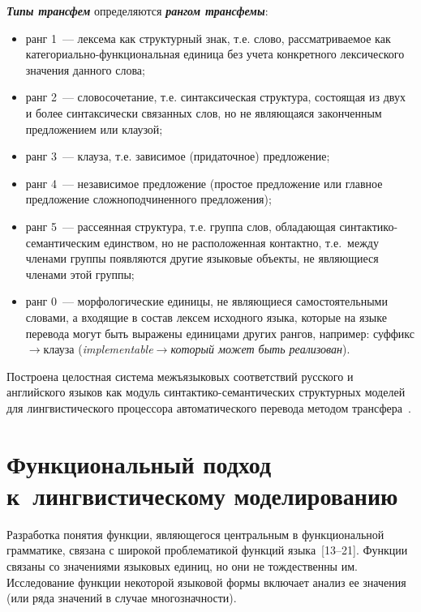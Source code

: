 \begin{multicols}{2}
{\bfseries\textit{Типы трансфем}} определяются {\bfseries\textit{рангом
транс\-фемы}}:
\begin{itemize}
\item ранг 1~--- лексема как структурный знак, т.е. слово, рассматриваемое
как ка\-те\-го\-ри\-аль\-но-функ\-цио\-наль\-ная единица без учета конкретного 
лексического значения данного слова;
\item ранг 2~--- словосочетание, т.е.  синтаксическая структура, состоящая
из двух и более синтаксически связанных слов, но не являющаяся
законченным предложением или клаузой;\\[-10pt]
\item ранг 3~--- клауза, т.е. зависимое (придаточное) предложение;\\[-10pt]
\item ранг 4~--- независимое предложение (простое предложение или
главное предложение сложноподчиненного предложения);\\[-10pt]
\item ранг 5~--- рассеянная структура, т.е. группа слов, обладающая
синтактико-семантическим единством, но не расположенная контактно,
т.е.\ между членами группы появляются другие языковые объекты, не
являющиеся членами этой группы;\\[-10pt]
\item ранг 0~--- морфологические единицы, не яв\-ля\-ющие\-ся
самостоятельными словами, а входя\-щие в состав лексем исходного языка, которые 
на языке перевода могут быть вы\-ра\-жены единицами других рангов, например: 
суффикс\;$\rightarrow$\;клауза 
(\textit{implementable}\;$\rightarrow$\;\textit{который может быть 
реализован}).
\end{itemize}

Построена целостная система межъязыковых соответствий русского и
английского языков как модуль синтактико-семантических структурных
моделей для лингвистического процессора автоматического перевода
методом трансфера~\cite{11koz, 12koz}.

\section{Функциональный подход к~лингвистическому
моделированию}

Разработка понятия функции, являющегося центральным в
функциональной грамматике, связана с широкой проблематикой функций
языка~[13--21]. Функции
связаны со значениями языковых единиц, но они не тождественны им.
Исследование функции некоторой языковой формы включает анализ ее
значения (или ряда значений в случае многозначности).


\end{multicols}
